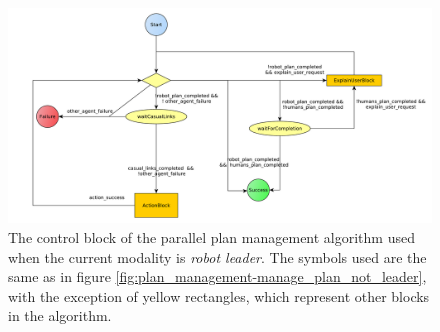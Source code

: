 \begin{figure}[ht!]
 \centering
 \includegraphics[scale=0.45]{img/plan_management/manage_plan_leader_control_block.pdf}
 \caption[The control block of the parallel plan management algorithm]{The control block of the parallel plan management algorithm used when the current modality is \textit{robot leader}. The symbols used are the same as in figure \ref{fig:plan_management-manage_plan_not_leader}, with the exception of yellow rectangles, which represent other blocks in the algorithm.}
 \label{fig:plan_management-manage_plan_leader_control_block}
 \end{figure}


